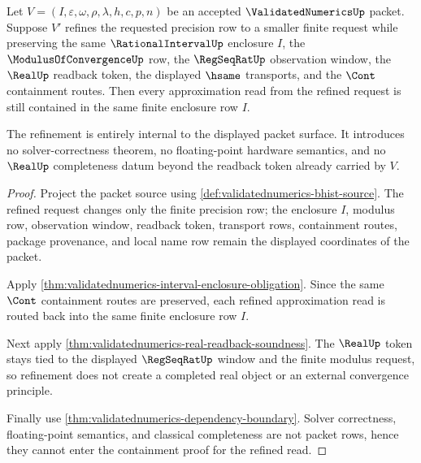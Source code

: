 \begin{theorem}
\label{thm:validatednumerics-precision-refinement-containment}
Let $V=(I,\varepsilon,\omega,\rho,\lambda,h,c,p,n)$ be an accepted
$\ValidatedNumericsUp$ packet. Suppose $V'$ refines the requested precision row
to a smaller finite request while preserving the same $\RationalIntervalUp$
enclosure $I$, the $\ModulusOfConvergenceUp$ row, the $\RegSeqRatUp$
observation window, the $\RealUp$ readback token, the displayed $\hsame$
transports, and the $\Cont$ containment routes. Then every approximation read
from the refined request is still contained in the same finite enclosure row
$I$.

The refinement is entirely internal to the displayed packet surface. It
introduces no solver-correctness theorem, no floating-point hardware
semantics, and no $\RealUp$ completeness datum beyond the readback token
already carried by $V$.
\end{theorem}
\begin{proof}
Project the packet source using
\autoref{def:validatednumerics-bhist-source}. The refined request changes only
the finite precision row; the enclosure $I$, modulus row, observation window,
readback token, transport rows, containment routes, package provenance, and
local name row remain the displayed coordinates of the packet.

Apply \autoref{thm:validatednumerics-interval-enclosure-obligation}. Since the
same $\Cont$ containment routes are preserved, each refined approximation read
is routed back into the same finite enclosure row $I$.

Next apply \autoref{thm:validatednumerics-real-readback-soundness}. The
$\RealUp$ token stays tied to the displayed $\RegSeqRatUp$ window and the
finite modulus request, so refinement does not create a completed real object
or an external convergence principle.

Finally use \autoref{thm:validatednumerics-dependency-boundary}. Solver
correctness, floating-point semantics, and classical completeness are not
packet rows, hence they cannot enter the containment proof for the refined
read.
\end{proof}

